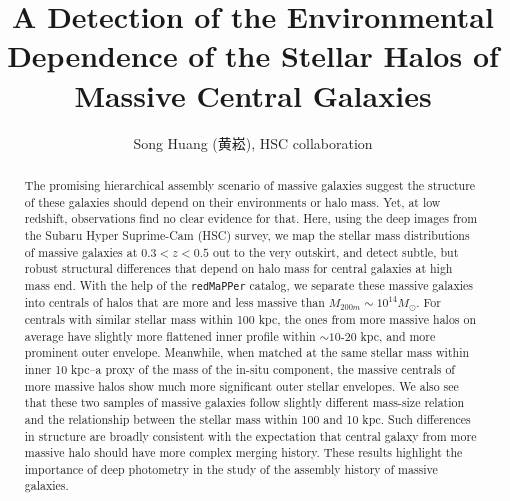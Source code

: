 \documentclass{emulateapj}
\def\redm{\texttt{redMaPPer}}
\newcommand{\todo}[1]{\textcolor{red}{\textbf{TODO:~#1}}}
\begin{document}
\begin{CJK*}{UTF8}{gbsn}


\title{A Detection of the Environmental Dependence of the Stellar Halos of 
       Massive Central Galaxies}

\author{Song Huang (黄崧), 
        HSC collaboration}   
        
        

\date{}                                          



\begin{abstract}
    
    The promising hierarchical assembly scenario of massive galaxies suggest the 
    structure of these galaxies should depend on their environments or halo mass.
    Yet, at low redshift, observations find no clear evidence for that. 
    Here, using the deep images from the Subaru Hyper Suprime-Cam (HSC) survey,
    we map the stellar mass distributions of massive galaxies at $0.3 < z < 0.5$ 
    out to the very outskirt, and detect subtle, but robust structural differences 
    that depend on halo mass for central galaxies at high mass end. 
    With the help of the \redm{} catalog, we separate these massive galaxies 
    into centrals of halos that are more and less massive than 
    $M_{200m}\sim 10^{14} M_{\odot}$.
    For centrals with similar stellar mass within 100 kpc, the ones from 
    more massive halos on average have slightly more flattened inner profile 
    within $\sim 10$-$20$ kpc, and more prominent outer envelope.
    Meanwhile, when matched at the same stellar mass within inner 10 kpc--a 
    proxy of the mass of the in-situ component, the massive centrals of more  
    massive halos show much more significant outer stellar envelopes.    
    We also see that these two samples of massive galaxies follow slightly 
    different mass-size relation and the relationship between the stellar mass 
    within 100 and 10 kpc.
    Such differences in structure are broadly consistent with the expectation that
    central galaxy from more massive halo should have more complex merging history.
    These results highlight the importance of deep photometry in the study of 
    the assembly history of massive galaxies.  


\end{abstract}
\end{CJK*}
\end{document}
